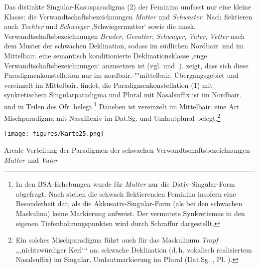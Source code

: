 Das distinkte Singular-Kasusparadigma (2) der Feminina umfasst nur eine kleine Klasse: die Verwandtschaftsbezeichnungen \textit{Mutter} und \textit{Schwester}. Nach \citet[137]{Rowley1997} flektieren auch \textit{Tochter} und \textit{Schwieger} ‚Schwiegermutter‘ sowie die mask. Verwandtschaftsbezeichnungen \textit{Bruder}, \textit{Gevatter}, \textit{Schwager}, \textit{Vater}, \textit{Vetter} nach dem Muster der schwachen Deklination, sodass im südlichen Nordbair. und im Mittelbair. eine semantisch konditionierte Deklinationsklasse ‚enge Verwandtschaftsbezeichnungen‘ anzusetzen ist (vgl. \citealt[122]{Steininger1994} und .).  zeigt, dass sich diese Paradigmenkonstellation nur im nord\-bair.-""mit\-tel\-bair. Übergangsgebiet und vereinzelt im Mittelbair. findet, die Paradigmenkonstellation (1) mit synkretischem Singularparadigma und Plural mit Nasalsuffix ist im Nordbair. und in Teilen des Ofr. belegt.{\footnote{In den BSA-Erhebungen wurde für \textit{Mutter} nur die Dativ-Singular-Form abgefragt. Nach \citet[137]{Rowley1997} stellen die schwach flektierenden Feminina insofern eine Besonderheit dar, als die Akkusativ-Singular-Form (als bei den schwachen Maskulina) keine Markierung aufweist. Der vermutete Synkretismus in den eigenen Tiefenbohrungspunkten wird durch Schraffur dargestellt.}}
Daneben ist vereinzelt im Mittelbair. eine Art Mischparadigma mit Nasalflexiv im Dat.Sg. und Umlautplural belegt.\footnote{Ein solches Mischparadigma führt \citet[88]{Eich1925} auch für das Maskulinum \textit{Tropf} „‚nichtswürdiger Kerl‘“ an: schwache Deklination (d.\,h. vokalisch realisiertem Nasalsuffix) im Singular, Umlautmarkierung im Plural (Dat.Sg.  , Pl. ).}

\begin{map}
\texttt{[image: figures/Karte25.png]}
\caption{Areale Verteilung der Paradigmen der schwachen Verwandtschaftsbezeichnungen \textit{Mutter} und \textit{Vater}}
\label{map:25}
\end{map}


